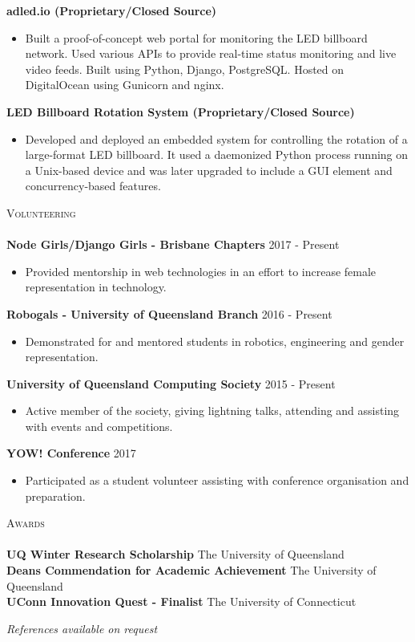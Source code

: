 \documentclass[a4paper]{article}
\newcommand{\lineunder} {
    \vspace*{-8pt} \\
    \hspace*{-18pt} \hrulefill \\
}
\newcommand{\header} [1] {
    {\hspace*{-18pt}\vspace*{6pt} \textsc{#1}}
    \vspace*{-6pt} \lineunder
}
\newenvironment{singleitem}
{   \small
    \vspace{-2.6pt}
    \begin{itemize}
    \setlength{\itemsep}{0pt}
    \setlength{\parskip}{0pt}
    \setlength{\parsep}{0pt}   }
{\end{itemize} \vspace{-2.6pt}	}
\begin{document}
\textbf{adled.io (Proprietary/Closed Source)}
\begin{singleitem}
	\item Built a proof-of-concept web portal for monitoring the LED billboard network. Used various APIs to provide real-time status monitoring and live video feeds. Built using Python, Django, PostgreSQL. Hosted on DigitalOcean using Gunicorn and nginx.
\end{singleitem}

\textbf{LED Billboard Rotation System (Proprietary/Closed Source)}
\begin{singleitem}
	\item Developed and deployed an embedded system for controlling the rotation of a large-format LED billboard. It used a daemonized Python process running on a Unix-based device and was later upgraded to include a GUI element and concurrency-based features.
\end{singleitem}

\header{Volunteering}
\textbf{Node Girls/Django Girls - Brisbane Chapters} \hfill 2017 - Present\\
\begin{singleitem}
	\item Provided mentorship in web technologies in an effort to increase female representation in technology.
\end{singleitem}
\textbf{Robogals - University of Queensland Branch} \hfill 2016 - Present\\
\begin{singleitem}
	\item Demonstrated for and mentored students in robotics, engineering and gender representation.
\end{singleitem}
\textbf{University of Queensland Computing Society} \hfill 2015 - Present\\
\begin{singleitem}
	\item Active member of the society, giving lightning talks, attending and assisting with events and competitions.
\end{singleitem}
\textbf{YOW! Conference} \hfill 2017\\
\begin{singleitem}
	\item Participated as a student volunteer assisting with conference organisation and preparation.
\end{singleitem}

\vspace{1mm}

\header{Awards}
\textbf{UQ Winter Research Scholarship} \hfill The University of Queensland\\
\textbf{Dean\textquotesingle{}s Commendation for Academic Achievement} \hfill The University of Queensland\\
\textbf{UConn Innovation Quest - Finalist} \hfill The University of Connecticut\\

\vspace{-1mm}
\begin{center}
\small \textit{References available on request}
\end{center}
\end{document}
